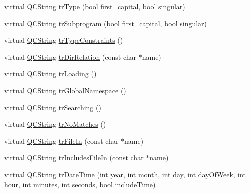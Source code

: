 \begin{DoxyCompactItemize}
\item 
virtual \hyperlink{class_q_c_string}{Q\+C\+String} \hyperlink{class_translator_croatian_ac2d6cc18fc740ca01b2ad50d747c9935}{tr\+Type} (\hyperlink{qglobal_8h_a1062901a7428fdd9c7f180f5e01ea056}{bool} first\+\_\+capital, \hyperlink{qglobal_8h_a1062901a7428fdd9c7f180f5e01ea056}{bool} singular)
\item 
virtual \hyperlink{class_q_c_string}{Q\+C\+String} \hyperlink{class_translator_croatian_ab5ccf8dd56048e10158a0ad5c528087c}{tr\+Subprogram} (\hyperlink{qglobal_8h_a1062901a7428fdd9c7f180f5e01ea056}{bool} first\+\_\+capital, \hyperlink{qglobal_8h_a1062901a7428fdd9c7f180f5e01ea056}{bool} singular)
\item 
virtual \hyperlink{class_q_c_string}{Q\+C\+String} \hyperlink{class_translator_croatian_af81d5be2e3456c26a74b2680e37a51b0}{tr\+Type\+Constraints} ()
\item 
virtual \hyperlink{class_q_c_string}{Q\+C\+String} \hyperlink{class_translator_croatian_a79721807827d60578646eb4002723bda}{tr\+Dir\+Relation} (const char $\ast$name)
\item 
virtual \hyperlink{class_q_c_string}{Q\+C\+String} \hyperlink{class_translator_croatian_a8132d4a84802c0fa136e950b12519919}{tr\+Loading} ()
\item 
virtual \hyperlink{class_q_c_string}{Q\+C\+String} \hyperlink{class_translator_croatian_a6ab170ee62500c65bdee276622b99e25}{tr\+Global\+Namespace} ()
\item 
virtual \hyperlink{class_q_c_string}{Q\+C\+String} \hyperlink{class_translator_croatian_a243180cf0268eaad696f4fc0373465a6}{tr\+Searching} ()
\item 
virtual \hyperlink{class_q_c_string}{Q\+C\+String} \hyperlink{class_translator_croatian_a829bcd344be0a07c509a7828f7cca3d9}{tr\+No\+Matches} ()
\item 
virtual \hyperlink{class_q_c_string}{Q\+C\+String} \hyperlink{class_translator_croatian_ada21cc324490f28413f2369c2bfe3251}{tr\+File\+In} (const char $\ast$name)
\item 
virtual \hyperlink{class_q_c_string}{Q\+C\+String} \hyperlink{class_translator_croatian_a5ca15edc2f650155561cb3a4e409e5a7}{tr\+Includes\+File\+In} (const char $\ast$name)
\item 
virtual \hyperlink{class_q_c_string}{Q\+C\+String} \hyperlink{class_translator_croatian_ab0b72227f89c1eacf7add3ddb4af4dc9}{tr\+Date\+Time} (int year, int month, int day, int day\+Of\+Week, int hour, int minutes, int seconds, \hyperlink{qglobal_8h_a1062901a7428fdd9c7f180f5e01ea056}{bool} include\+Time)

\end{DoxyCompactItemize}
